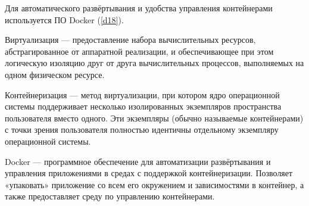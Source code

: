Для автоматического развёртывания и удобства управления контейнерами используется ПО Docker (\ref{d18}).
\begin{definition}
    \label{d16}
    Виртуализация — предоставление набора вычислительных ресурсов, абстрагированное от аппаратной реализации,
    и обеспечивающее при этом логическую изоляцию друг от друга вычислительных процессов, выполняемых на одном
    физическом ресурсе. 
\end{definition}
\begin{definition}
    \label{d17}
    Контейнеризация — метод виртуализации, при котором ядро операционной системы поддерживает несколько изолированных
    экземпляров пространства пользователя вместо одного. Эти экземпляры (обычно называемые контейнерами) с точки зрения
    пользователя полностью идентичны отдельному экземпляру операционной системы.
\end{definition}
\begin{definition}
    \label{d18}
    Docker — программное обеспечение для автоматизации развёртывания и управления приложениями в средах с
    поддержкой контейнеризации. Позволяет «упаковать» приложение со всем его окружением и зависимостями в контейнер,
    а также предоставляет среду по управлению контейнерами.
\end{definition}